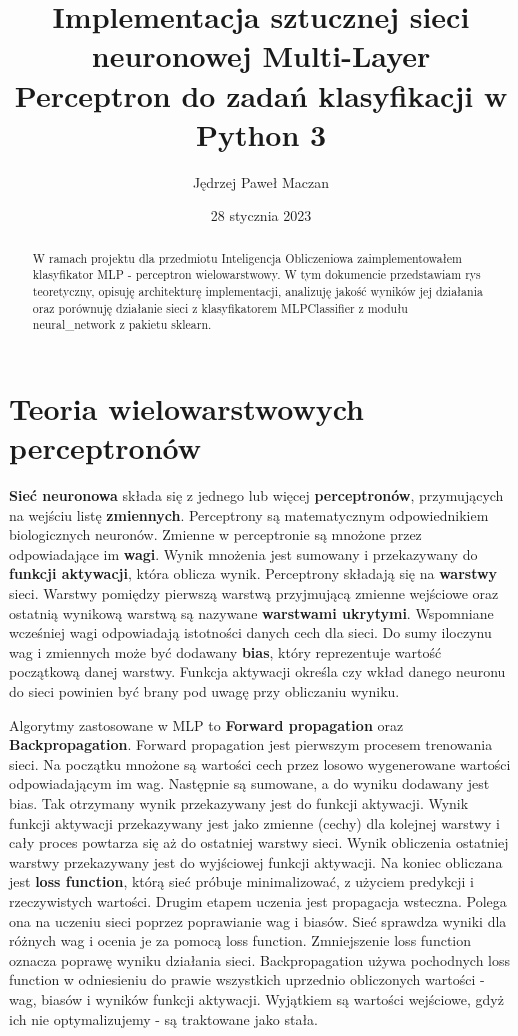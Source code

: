 \documentclass[12pt]{article}
\title{Implementacja sztucznej sieci neuronowej Multi-Layer Perceptron do zadań klasyfikacji w Python 3}
\author{Jędrzej Paweł Maczan}
\date{28 stycznia 2023}
\begin{document}
\markboth{\theauthor}{\thetitle}

\maketitle


\begin{abstract}
W ramach projektu dla przedmiotu Inteligencja Obliczeniowa zaimplementowałem klasyfikator MLP - perceptron wielowarstwowy. W tym dokumencie przedstawiam rys teoretyczny, opisuję architekturę implementacji, analizuję jakość wyników jej działania oraz porównuję działanie sieci z klasyfikatorem MLPClassifier z modułu neural\_network z pakietu sklearn.
\end{abstract}


\section{Teoria wielowarstwowych perceptronów}

\textbf{Sieć neuronowa} składa się z jednego lub więcej \textbf{perceptronów}, przymujących na wejściu listę \textbf{zmiennych}. Perceptrony są matematycznym odpowiednikiem biologicznych neuronów. Zmienne w perceptronie są mnożone przez odpowiadające im \textbf{wagi}. Wynik mnożenia jest sumowany i przekazywany do \textbf{funkcji aktywacji}, która oblicza wynik. Perceptrony składają się na \textbf{warstwy} sieci. Warstwy pomiędzy pierwszą warstwą przyjmującą zmienne wejściowe oraz ostatnią wynikową warstwą są nazywane \textbf{warstwami ukrytymi}. Wspomniane wcześniej wagi odpowiadają istotności danych cech dla sieci. Do sumy iloczynu wag i zmiennych może być dodawany \textbf{bias}, który reprezentuje wartość początkową danej warstwy. Funkcja aktywacji określa czy wkład danego neuronu do sieci powinien być brany pod uwagę przy obliczaniu wyniku.

Algorytmy zastosowane w MLP to \textbf{Forward propagation} oraz \textbf{Backpropagation}. Forward propagation jest pierwszym procesem trenowania sieci. Na początku mnożone są wartości cech przez losowo wygenerowane wartości odpowiadającym im wag. Następnie są sumowane, a do wyniku dodawany jest bias. Tak otrzymany wynik przekazywany jest do funkcji aktywacji. Wynik funkcji aktywacji przekazywany jest jako zmienne (cechy) dla kolejnej warstwy i cały proces powtarza się aż do ostatniej warstwy sieci. Wynik obliczenia ostatniej warstwy przekazywany jest do wyjściowej funkcji aktywacji. Na koniec obliczana jest \textbf{loss function}, którą sieć próbuje minimalizować, z użyciem predykcji i rzeczywistych wartości. Drugim etapem uczenia jest propagacja wsteczna. Polega ona na uczeniu sieci poprzez poprawianie wag i biasów. Sieć sprawdza wyniki dla różnych wag i ocenia je za pomocą loss function. Zmniejszenie loss function oznacza poprawę wyniku działania sieci. Backpropagation używa pochodnych loss function w odniesieniu do prawie wszystkich uprzednio obliczonych wartości - wag, biasów i wyników funkcji aktywacji. Wyjątkiem są wartości wejściowe, gdyż ich nie optymalizujemy - są traktowane jako stała.
\end{document}

